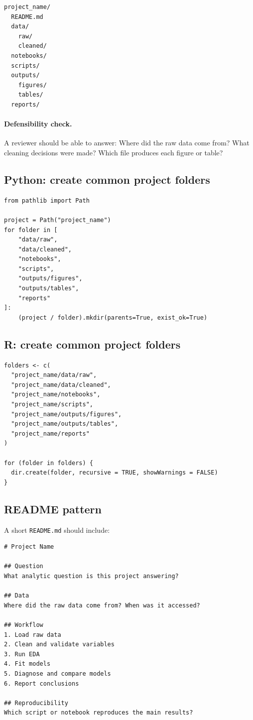 \begin{verbatim}
project_name/
  README.md
  data/
    raw/
    cleaned/
  notebooks/
  scripts/
  outputs/
    figures/
    tables/
  reports/
\end{verbatim}

\paragraph{Defensibility check.} A reviewer should be able to answer: Where did the raw data come from? What cleaning decisions were made? Which file produces each figure or table?

\subsection*{Python: create common project folders}

\begin{verbatim}
from pathlib import Path

project = Path("project_name")
for folder in [
    "data/raw",
    "data/cleaned",
    "notebooks",
    "scripts",
    "outputs/figures",
    "outputs/tables",
    "reports"
]:
    (project / folder).mkdir(parents=True, exist_ok=True)
\end{verbatim}

\subsection*{R: create common project folders}

\begin{verbatim}
folders <- c(
  "project_name/data/raw",
  "project_name/data/cleaned",
  "project_name/notebooks",
  "project_name/scripts",
  "project_name/outputs/figures",
  "project_name/outputs/tables",
  "project_name/reports"
)

for (folder in folders) {
  dir.create(folder, recursive = TRUE, showWarnings = FALSE)
}
\end{verbatim}

\subsection*{README pattern}

A short \texttt{README.md} should include:

\begin{verbatim}
# Project Name

## Question
What analytic question is this project answering?

## Data
Where did the raw data come from? When was it accessed?

## Workflow
1. Load raw data
2. Clean and validate variables
3. Run EDA
4. Fit models
5. Diagnose and compare models
6. Report conclusions

## Reproducibility
Which script or notebook reproduces the main results?
\end{verbatim}

